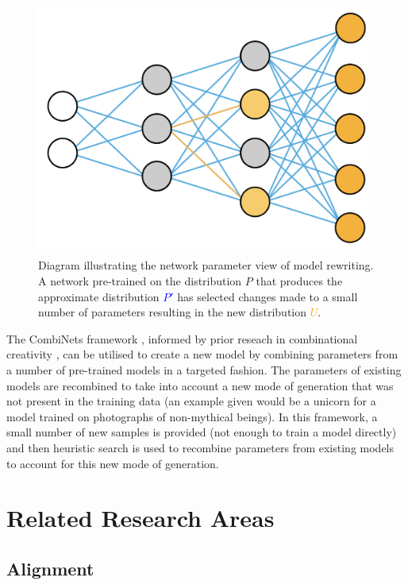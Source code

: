 \begin{figure}[!htbp]
    \centering
    \includegraphics[width=1\textwidth]{figures/c6_active_div/diagrams/model_rewriting.png}
    \caption[Diagram illustrating the network parameter view of model rewriting.]{Diagram illustrating the network parameter view of model rewriting. A network pre-trained on the distribution $P$ that produces the approximate distribution \textcolor{blue}{$P'$} has selected changes made to a small number of parameters resulting in the new distribution \textcolor{orange}{$U$}.}
  \label{fig:c6:model-rewriting}
  \end{figure}

The CombiNets framework \citep{guzdial2018combinets}, informed by prior reseach in combinational creativity \citep{boden2004creative}, can be utilised to create a new model by combining parameters from a number of pre-trained models in a targeted fashion. 
The parameters of existing models are recombined to take into account a new mode of generation that was not present in the training data (an example given would be a unicorn for a model trained on photographs of non-mythical beings). 
In this framework, a small number of new samples is provided (not enough to train a model directly) and then heuristic search is used to recombine parameters from existing models to account for this new mode of generation.

\section{Related Research Areas}

\subsection{Alignment}

